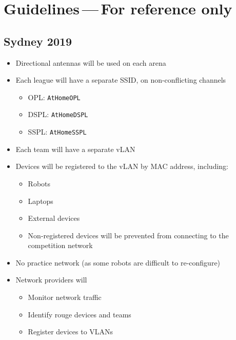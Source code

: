 \chapter[Guidelines]{Guidelines{\color{gray}\,---\,For reference only}}
\section{Sydney 2019}

\begin{itemize}[nosep]
	\item Directional antennas will be used on each arena
	\item Each league will have a separate SSID, on non-conflicting channels
	\begin{itemize}[nosep]
		\item OPL: \texttt{AtHomeOPL}
		\item DSPL: \texttt{AtHomeDSPL}
		\item SSPL: \texttt{AtHomeSSPL}
	\end{itemize}
	\item Each team will have a separate vLAN
	\item Devices will be registered to the vLAN by MAC address, including:
	\begin{itemize}[nosep]
		\item Robots
		\item Laptops
		\item External devices
		\item Non-registered devices will be prevented from connecting to the competition network
	\end{itemize}
	\item No practice network (as some robots are difficult to re-configure)
	\item Network providers will
	\begin{itemize}[nosep]
		\item Monitor network traffic
		\item Identify rouge devices and teams
		\item Register devices to VLANs
	\end{itemize}


\end{itemize}
